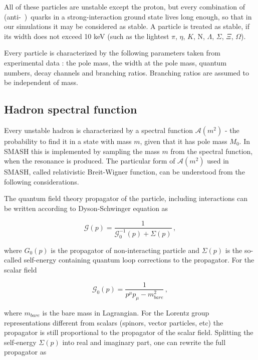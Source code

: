 All of these particles are unstable except the proton, but every combination of
 (anti-~)~quarks in a strong-interaction ground state lives long enough, so that in
our simulations it may be considered as stable. A particle is treated as
stable, if its width does not exceed 10 keV (such as the lightest $\pi$, $\eta$, $K$,
N, $\Lambda$, $\Sigma$, $\Xi$, $\Omega$).

Every particle is characterized by the following parameters taken from
experimental data \cite{Agashe:2014kda}: the pole mass, the width at the pole mass,
quantum numbers, decay channels and branching ratios. Branching ratios are assumed to
be independent of mass.

\subsection{Hadron spectral function} \label{sec:spectral_function}

Every unstable hadron is characterized by a spectral function $\mathcal{A}(m^2)$ -
the probability to find it in a state with mass $m$, given that it has
pole mass $M_0$. In SMASH this is implemented by sampling the mass $m$
from the spectral function, when the resonance is produced. The particular
form of $\mathcal{A}(m^2)$ used in SMASH, called relativistic Breit-Wigner function,
can be understood from the following considerations.

The quantum field theory propagator of the particle, including interactions can be
written according to Dyson-Schwinger equation as

\begin{equation}
  \mathcal{G}(p) = \frac{1}{\mathcal{G}_0^{-1}(p) + \Sigma(p)} \,,
\end{equation}

where $G_0(p)$ is the propagator of non-interacting particle and $\Sigma(p)$ is
the so-called self-energy containing quantum loop corrections to the propagator. For
the scalar field

\begin{equation}
  \mathcal{G}_0(p) = \frac{1}{p^{\mu}p_{\mu} - m_{bare}^2} \,,
\end{equation}

where $m_{bare}$ is the bare mass in Lagrangian. For the Lorentz group representations
different from scalars (spinors, vector particles, etc) the propagator is still
proportional to the propagator of the scalar field. Splitting the self-energy
$\Sigma(p)$ into real and imaginary part, one can rewrite the full propagator as


